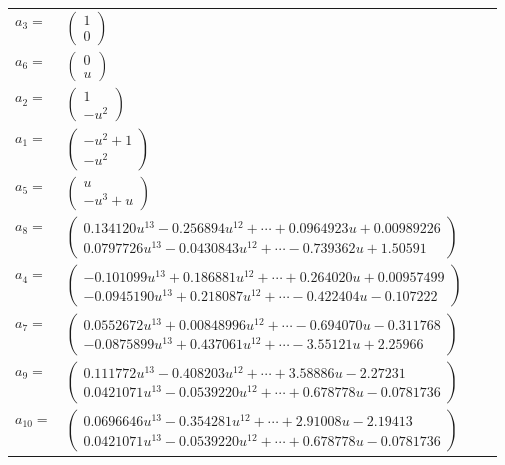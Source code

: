\documentclass[1p]{elsarticle_modified}
\theoremstyle{definition}
\begin{document}
\begin{tabular}{m{7pt} m{180pt} m{7pt} m{180pt} }
\flushright $a_{3}=$&$\begin{pmatrix}1\\0\end{pmatrix}$ \\
\flushright $a_{6}=$&$\begin{pmatrix}0\\u\end{pmatrix}$ \\
\flushright $a_{2}=$&$\begin{pmatrix}1\\- u^2\end{pmatrix}$ \\
\flushright $a_{1}=$&$\begin{pmatrix}- u^2+1\\- u^2\end{pmatrix}$ \\
\flushright $a_{5}=$&$\begin{pmatrix}u\\- u^3+u\end{pmatrix}$ \\
\flushright $a_{8}=$&$\begin{pmatrix}0.134120 u^{13}-0.256894 u^{12}+\cdots+0.0964923 u+0.00989226\\0.0797726 u^{13}-0.0430843 u^{12}+\cdots-0.739362 u+1.50591\end{pmatrix}$ \\
\flushright $a_{4}=$&$\begin{pmatrix}-0.101099 u^{13}+0.186881 u^{12}+\cdots+0.264020 u+0.00957499\\-0.0945190 u^{13}+0.218087 u^{12}+\cdots-0.422404 u-0.107222\end{pmatrix}$ \\
\flushright $a_{7}=$&$\begin{pmatrix}0.0552672 u^{13}+0.00848996 u^{12}+\cdots-0.694070 u-0.311768\\-0.0875899 u^{13}+0.437061 u^{12}+\cdots-3.55121 u+2.25966\end{pmatrix}$ \\
\flushright $a_{9}=$&$\begin{pmatrix}0.111772 u^{13}-0.408203 u^{12}+\cdots+3.58886 u-2.27231\\0.0421071 u^{13}-0.0539220 u^{12}+\cdots+0.678778 u-0.0781736\end{pmatrix}$ \\
\flushright $a_{10}=$&$\begin{pmatrix}0.0696646 u^{13}-0.354281 u^{12}+\cdots+2.91008 u-2.19413\\0.0421071 u^{13}-0.0539220 u^{12}+\cdots+0.678778 u-0.0781736\end{pmatrix}$ \\

\end{tabular}
\end{document}
